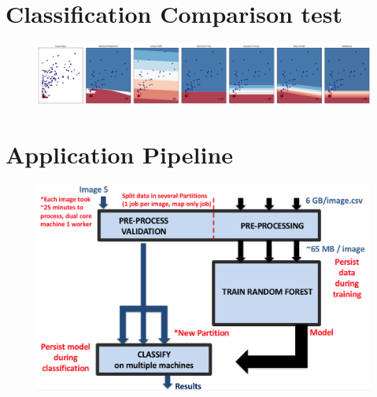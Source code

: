 \documentclass{neu_handout}
\begin{document}
\newpage

\section{Classification Comparison test}
\begin{figure}[!h]
  \includegraphics[width=1\linewidth]{classification-test}
  \label{fig:classification-test}
\end{figure}

\section{Application Pipeline}
\begin{figure}[!h]
  \includegraphics[width=0.7\linewidth]{pipeline}
  \label{fig:pipeline}
\end{figure}
\end{document}
